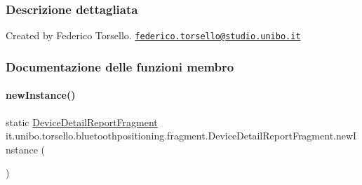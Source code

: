 \subsubsection{Descrizione dettagliata}
Created by Federico Torsello. \href{mailto:federico.torsello@studio.unibo.it}{\tt federico.\+torsello@studio.\+unibo.\+it} 

\subsubsection{Documentazione delle funzioni membro}
\hypertarget{classit_1_1unibo_1_1torsello_1_1bluetoothpositioning_1_1fragment_1_1DeviceDetailReportFragment_a91531900ca550e51463fe827be0d5851_a91531900ca550e51463fe827be0d5851}{}\label{classit_1_1unibo_1_1torsello_1_1bluetoothpositioning_1_1fragment_1_1DeviceDetailReportFragment_a91531900ca550e51463fe827be0d5851_a91531900ca550e51463fe827be0d5851} 
\paragraph{\texorpdfstring{new\+Instance()}{newInstance()}}
{\footnotesize\ttfamily static \hyperlink{classit_1_1unibo_1_1torsello_1_1bluetoothpositioning_1_1fragment_1_1DeviceDetailReportFragment}{Device\+Detail\+Report\+Fragment} it.\+unibo.\+torsello.\+bluetoothpositioning.\+fragment.\+Device\+Detail\+Report\+Fragment.\+new\+Instance (\begin{DoxyParamCaption}{ }\end{DoxyParamCaption})\hspace{0.3cm}{\ttfamily [static]}}



